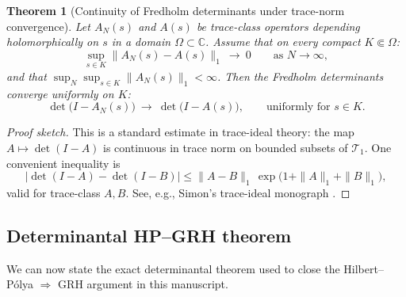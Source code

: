 \documentclass[11pt,oneside]{amsbook}
\numberwithin{equation}{section}
\theoremstyle{plain}
\newtheorem{theorem}{Theorem}[section]
\theoremstyle{definition}
\theoremstyle{remark}
\newcommand{\C}{\mathbb{C}}
\begin{document}
\begin{theorem}[Continuity of Fredholm determinants under trace-norm convergence]
\label{thm:fredholm_det_continuity}
Let $A_N(s)$ and $A(s)$ be trace-class operators depending holomorphically on $s$ in a domain $\Omega\subset\C$.
Assume that on every compact $K\Subset\Omega$:
\[
\sup_{s\in K}\|A_N(s)-A(s)\|_1\ \longrightarrow\ 0
\qquad\text{as }N\to\infty,
\]
and that $\sup_{N}\sup_{s\in K}\|A_N(s)\|_1<\infty$.
Then the Fredholm determinants converge uniformly on $K$:
\[
\det\!\bigl(I-A_N(s)\bigr)\ \longrightarrow\ \det\!\bigl(I-A(s)\bigr),
\qquad \text{uniformly for }s\in K.
\]
\end{theorem}

\begin{proof}[Proof sketch]
This is a standard estimate in trace-ideal theory: the map $A\mapsto \det(I-A)$ is continuous in trace norm on bounded subsets of $\mathcal{T}_1$.
One convenient inequality is
\[
\bigl|\det(I-A)-\det(I-B)\bigr|
\le \|A-B\|_1\,\exp\!\bigl(1+\|A\|_1+\|B\|_1\bigr),
\]
valid for trace-class $A,B$.
See, e.g., Simon's trace-ideal monograph \cite{SimonTraceIdeals}.
\end{proof}

\subsection{Determinantal HP--GRH theorem}
\label{sec:determinantal_HP_GRH_theorem}

We can now state the exact determinantal theorem used to close the Hilbert--Pólya $\Rightarrow$ GRH argument in this manuscript.
\end{document}
